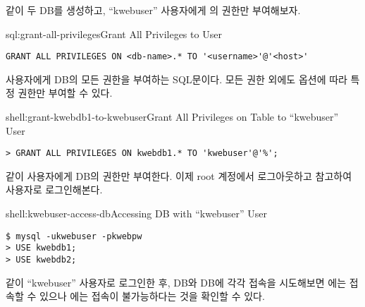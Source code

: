 \와 같이 두 DB를 생성하고, ``kwebuser'' 사용자에게 의 권한만 부여해보자.

\begin{sqlenv}{sql:grant-all-privileges}{Grant All Privileges to User}\begin{verbatim}
GRANT ALL PRIVILEGES ON <db-name>.* TO '<username>'@'<host>'
\end{verbatim}
\end{sqlenv}

\는 사용자에게  DB의 모든 권한을 부여하는 SQL문이다. 모든 권한 외에도 옵션에 따라 특정 권한만 부여할 수 있다.

\begin{shellenv}{shell:grant-kwebdb1-to-kwebuser}{Grant All Privileges on  Table to ``kwebuser'' User}\begin{verbatim}
> GRANT ALL PRIVILEGES ON kwebdb1.* TO 'kwebuser'@'%';
\end{verbatim}
\end{shellenv}

\와 같이  사용자에게  DB의 권한만 부여한다. 이제 root 계정에서 로그아웃하고 \을 참고하여  사용자로 로그인해본다.

\begin{shellenv}{shell:kwebuser-access-db}{Accessing DB with ``kwebuser'' User}\begin{verbatim}
$ mysql -ukwebuser -pkwebpw
> USE kwebdb1;
> USE kwebdb2;
\end{verbatim}
\end{shellenv}

\와 같이 ``kwebuser'' 사용자로 로그인한 후,  DB와  DB에 각각 접속을 시도해보면 에는 접속할 수 있으나 에는 접속이 불가능하다는 것을 확인할 수 있다.
